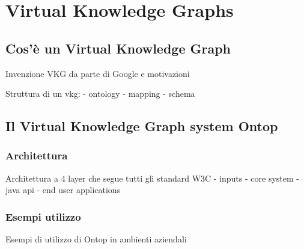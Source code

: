 \chapter{Virtual Knowledge Graphs}
\label{cha:vkg}

\section{Cos'è un Virtual Knowledge Graph}
\label{sec:vkg_description}
Invenzione VKG da parte di Google e motivazioni

Struttura di un vkg:
- ontology 
- mapping
- schema


\section{Il Virtual Knowledge Graph system Ontop}
\label{sec:vkg_ontop}

\subsection{Architettura}
Architettura a 4 layer che segue tutti gli standard W3C
- inputs
- core system
- java api
- end user applications

\subsection{Esempi utilizzo}
Esempi di utilizzo di Ontop in ambienti aziendali



